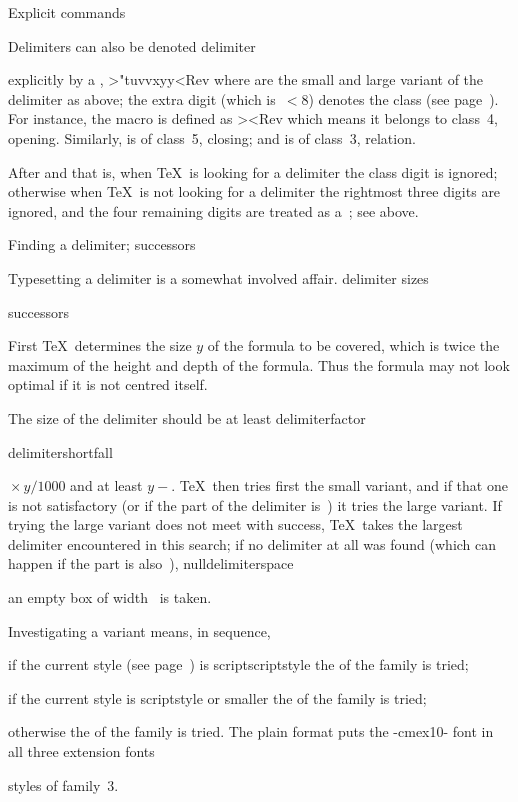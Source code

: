 \spoint Explicit  commands

Delimiters can also be denoted 
\csterm delimiter\par
explicitly by a ,
\Ver>\delimiter"tuvvxyy<Rev
where  are the small and large variant of the
delimiter as above;
the extra digit  (which is~$<8$) denotes the class
(see page~).
For instance, the  macro is defined as
\Ver>\def\langle{\delimiter "426830A }<Rev
which means it belongs to class~4, opening. Similarly,
 is of class~5, closing; and  is of class~3,
relation.

After  and  \ldash that is, when \TeX\
is looking for a delimiter \rdash  the class digit is ignored;
otherwise \ldash when \TeX\ is not looking for a delimiter \rdash 
the rightmost three digits are ignored, and the
four remaining digits are treated as a~; see above.

\spoint[successor] Finding a delimiter; successors

Typesetting a delimiter is a somewhat involved affair.
\term delimiter sizes\par\term successors\par
First \TeX\ determines the size $y$ of the formula to be covered,
which is twice the maximum of the height and depth of the
formula. Thus the formula may not look optimal if
it is not centred itself.

The size of the delimiter should be at least 
\csterm delimiterfactor\par\csterm delimitershortfall\par
{}${}\times y/1000$ and at least 
$y-{}$.
\TeX\ then tries first the small variant, and if that one
is not satisfactory (or if the  part of the delimiter
is~) it tries the large variant. If trying the large variant
does not meet with success, \TeX\ takes the largest delimiter
encountered in this search; if no delimiter at all was found
(which can happen if  the  part is
\altt
also~),
\csterm nulldelimiterspace\par
an empty box of width~ is taken.

Investigating a variant means, in sequence,
\itemlist \item if the current style (see page~)
is scriptscriptstyle
the  of the family is tried;
\item if the current style is scriptstyle or smaller
the  of the family is tried;
\item otherwise the  of the family is tried.\itemliststop
The plain format puts the \ver-cmex10- font  in all three
\term extension fonts\par
styles of family~3.

